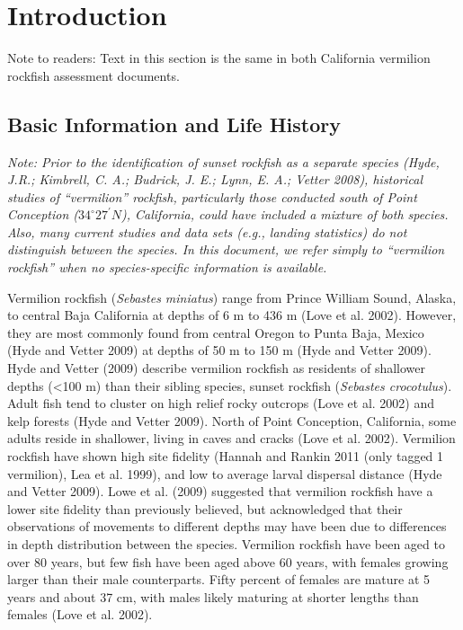 \documentclass[
  english,
  a4paper,
]{article}
\begin{document}
\pagebreak
\setlength{\parskip}{5mm plus1mm minus1mm}
\setcounter{page}{1}
\renewcommand{\thefigure}{\arabic{figure}}
\renewcommand{\thetable}{\arabic{table}}
\setcounter{table}{0}
\setcounter{figure}{0}

\hypertarget{introduction}{%
\section{Introduction}\label{introduction}}

Note to readers: Text in this section is the same in both California vermilion rockfish assessment
documents.

\hypertarget{basic-information-and-life-history}{%
\subsection{Basic Information and Life History}\label{basic-information-and-life-history}}

\emph{Note: Prior to the identification of sunset rockfish as a separate species (Hyde, J.R.; Kimbrell, C. A.; Budrick, J. E.; Lynn, E. A.; Vetter 2008), historical studies of ``vermilion'' rockfish, particularly those conducted south of Point Conception ($34^\circ 27^\prime N$), California, could have included a mixture of both species. Also, many current studies and data sets (e.g., landing statistics) do not distinguish between the species. In this document, we refer simply to ``vermilion rockfish'' when no species-specific information is available.}

Vermilion rockfish (\emph{Sebastes miniatus}) range from Prince William Sound, Alaska, to central Baja California at
depths of 6 m to 436 m (Love et al. 2002). However, they are most commonly found from central Oregon
to Punta Baja, Mexico (Hyde and Vetter 2009) at depths of 50 m to 150 m (Hyde and Vetter 2009). Hyde and Vetter
(2009) describe vermilion rockfish as residents of shallower depths (\textless100 m) than their sibling species,
sunset rockfish (\emph{Sebastes crocotulus}). Adult fish tend to cluster on high relief rocky outcrops (Love et al. 2002)
and kelp forests (Hyde and Vetter 2009). North of Point Conception, California, some adults reside in shallower,
living in caves and cracks (Love et al. 2002). Vermilion rockfish have shown high site fidelity
(Hannah and Rankin 2011 (only tagged 1 vermilion), Lea et al. 1999), and low to average larval dispersal
distance (Hyde and Vetter 2009). Lowe et al. (2009) suggested that vermilion rockfish
have a lower site fidelity than previously believed, but acknowledged that their
observations of movements to different depths may have been due to differences in depth distribution between the species.
Vermilion rockfish have been aged to over 80 years, but few fish have been aged above 60 years, with females growing larger than their male counterparts. Fifty percent of females are mature at 5 years and about
37 cm, with males likely maturing at shorter lengths than females (Love et al. 2002).
\end{document}
